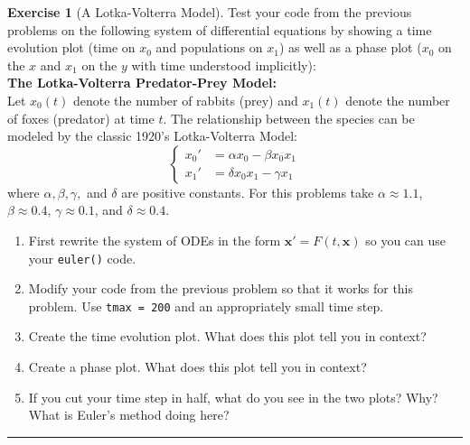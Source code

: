 \documentclass[
]{book}
\providecommand{\tightlist}{%
  \setlength{\itemsep}{0pt}\setlength{\parskip}{0pt}}
\theoremstyle{definition}
\theoremstyle{definition}
\theoremstyle{definition}
\newtheorem{exercise}{Exercise}[chapter]
\theoremstyle{remark}
\begin{document}
\begin{exercise}[A Lotka-Volterra Model]
\protect\hypertarget{exr:unnamed-chunk-437}{}{\label{exr:unnamed-chunk-437} {} }Test your code from the previous problems on the following system of differential equations by showing a time evolution plot (time on \(x_0\) and populations on \(x_1\)) as well as a phase plot (\(x_0\) on the \(x\) and \(x_1\) on the \(y\) with time understood implicitly):\\
\textbf{The Lotka-Volterra Predator-Prey Model:}\\
Let \(x_0(t)\) denote the number of rabbits (prey) and \(x_1(t)\) denote the
number of foxes (predator) at time \(t\). The relationship between the
species can be modeled by the classic 1920's Lotka-Volterra Model:
\[\left\{ \begin{array}{ll} x_0' &= \alpha x_0 - \beta x_0 x_1 \\ x_1' &= \delta x_0 x_1 - \gamma x_1 \end{array} \right.\]
where \(\alpha, \beta, \gamma,\) and
\(\delta\) are positive constants. For this problems take
\(\alpha \approx 1.1\), \(\beta \approx 0.4\), \(\gamma \approx 0.1\), and
\(\delta \approx 0.4\).

\begin{enumerate}
\def\labelenumi{\alph{enumi}.}
\tightlist
\item
  First rewrite the system of ODEs in the form \(\boldsymbol{x}' = F(t,\boldsymbol{x})\) so you can use your \texttt{euler()} code.\\
\item
  Modify your code from the previous problem so that it works for this problem. Use \texttt{tmax\ =\ 200} and an appropriately small time step.
\item
  Create the time evolution plot. What does this plot tell you in context?
\item
  Create a phase plot. What does this plot tell you in context?\\
\item
  If you cut your time step in half, what do you see in the two plots? Why? What is Euler's method doing here?
\end{enumerate}
\end{exercise}

\begin{center}\rule{0.5\linewidth}{0.5pt}\end{center}
\end{document}
